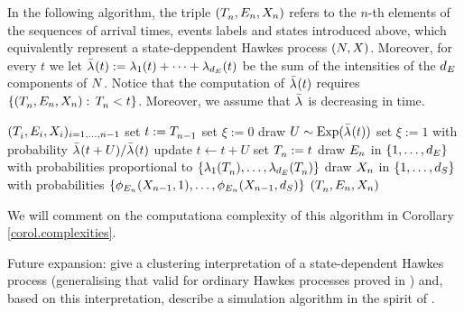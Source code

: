 \documentclass[10pt]{article}
\begin{document}
In the following algorithm, the triple $(\arrivalTimes[]_n,\event[n],\stateVariable_n)$ refers to the $n$-th elements of the sequences of arrival times, events labels and states introduced above, which equivalently represent a state-deppendent Hawkes process $(\multiCountingProc, \stateVariable)$. Moreover, for every $t$ we let $\bar{\intensity[]}(t):= \intensity[1](t) + \dots + \intensity[\numEventTypes](t)$ be the sum of the intensities of the $\numEventTypes$ components of $\multiCountingProc$. Notice that the computation of $\bar{\intensity[]}(t)$ requires $\lbrace(\arrivalTimes[]_n,\event[n],\stateVariable_n): \, \arrivalTimes[]_n <t\rbrace$. Moreover, we assume that $\bar{\intensity[]}$ is decreasing in time. 
\begin{algorithm}
 \caption{{\citealp[Algorithm 2.4]{MP18sta}}}
 \label{algo.MP18_ogata}
 \begin{algorithmic}[5]
  \REQUIRE $(\arrivalTimes[]_i, \event[i], \stateVariable_i)_{i=1,\dots,n-1}$
  \STATE set $t:=\arrivalTimes[]_{n-1}$
  \STATE set $\xi:=0$
  \STATE draw $U \sim \text{Exp}(\bar{\intensity[]}(t))$
  \STATE set $\xi :=1$ with probability $\bar{\intensity[]}(t+U)/\bar{\intensity[]}(t)$
  \STATE update $t\leftarrow t+U$
  \ENDWHILE
  \STATE set $\arrivalTimes[]_n:=t$
  \STATE draw $\event[n]$ in $\lbrace 1,\dots,\numEventTypes\rbrace$ with probabilities proportional to $\lbrace \intensity[1](\arrivalTimes[]_n), \dots, \intensity[\numEventTypes](\arrivalTimes[]_n)\rbrace$
  \STATE draw $\stateVariable_n$ in $\lbrace 1,\dots,\numStates\rbrace$ with probabilities $\lbrace \transProb_{\event}(\stateVariable_{n-1},1), \dots,\transProb_{\event}(\stateVariable_{n-1},\numStates)\rbrace$
  \RETURN $(\arrivalTimes[]_n,\event[n],\stateVariable_n)$
 \end{algorithmic}
\end{algorithm}

We will comment on the computationa complexity of this algorithm in Corollary \ref{corol.complexities}. 


Future expansion: give a clustering interpretation of a state-dependent Hawkes process (generalising that valid for ordinary Hawkes processes proved in \citealp{HO74clu}) and, based on this interpretation, describe a simulation algorithm in the spirit of \citealp{MR05per}.
\end{document}
